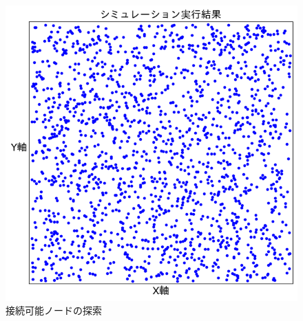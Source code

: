 \documentclass[a4paper, 11pt]{ltjsarticle}
\begin{document}
\begin{enumerate}[label=\textbf{(\arabic*)}]
        \begin{figure}[H]
          \centering
          \includegraphics[width=130mm]{first_step.png}
          \caption{接続可能ノードの探索}
          \label{figure:fourth_step}
        \end{figure}
\end{enumerate}




\clearpage
\end{document}
